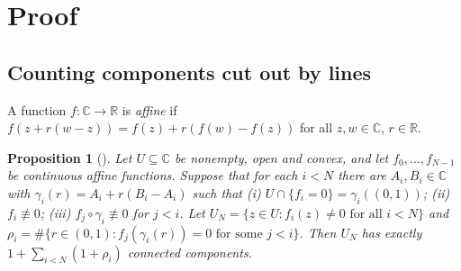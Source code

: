 \documentclass[11pt]{amsart}
\theoremstyle{plain}
\newtheorem{proposition}[theorem]{Proposition}
\theoremstyle{definition}
\newcommand{\C}{\mathbb{C}}
\begin{document}
\section{Proof}\label{sec:proof}

\subsection{Counting components cut out by lines}

A function $f:\C\to\mathbb{R}$ is \emph{affine} if $f(z+r(w-z))=f(z)+r(f(w)-f(z))$ for all $z,w\in\C$, $r\in\mathbb{R}$.

\begin{proposition}[]\label{prop:count}
Let $U\subseteq\C$ be nonempty, open and convex, and let $f_0,\dots,f_{N-1}$ be continuous affine functions. Suppose that for each $i<N$ there are $A_i,B_i\in\C$ with $\gamma_i(r)=A_i+r(B_i-A_i)$ such that
(i) $U\cap\{f_i=0\}=\gamma_i((0,1))$; (ii) $f_i\not\equiv0$; (iii) $f_j\circ\gamma_i\not\equiv0$ for $j<i$.
Let $U_N=\{z\in U: f_i(z)\ne0\text{ for all }i<N\}$ and $\rho_i=\#\{r\in(0,1): f_j(\gamma_i(r))=0\text{ for some }j<i\}$. Then $U_N$ has exactly $1+\sum_{i<N}(1+\rho_i)$ connected components.
\end{proposition}
\end{document}
